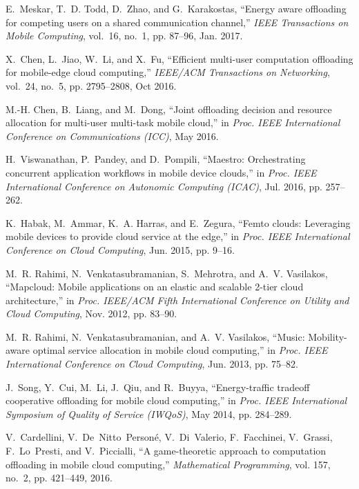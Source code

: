 \documentclass[10pt,journal,compsoc]{IEEEtran}
\begin{document}
{\begin{thebibliography}{10}
E.~Meskar, T.~D. Todd, D.~Zhao, and G.~Karakostas, ``Energy aware offloading
  for competing users on a shared communication channel,'' \emph{IEEE
  Transactions on Mobile Computing}, vol.~16, no.~1, pp. 87--96, Jan. 2017.

X.~Chen, L.~Jiao, W.~Li, and X.~Fu, ``Efficient multi-user computation
  offloading for mobile-edge cloud computing,'' \emph{IEEE/ACM Transactions on
  Networking}, vol.~24, no.~5, pp. 2795--2808, Oct 2016.

M.-H. Chen, B.~Liang, and M.~Dong, ``Joint offloading decision and resource
  allocation for multi-user multi-task mobile cloud,'' in \emph{Proc. IEEE
  International Conference on Communications (ICC)}, May 2016.

H.~Viswanathan, P.~Pandey, and D.~Pompili, ``Maestro: Orchestrating concurrent
  application workflows in mobile device clouds,'' in \emph{Proc. IEEE
  International Conference on Autonomic Computing (ICAC)}, Jul. 2016, pp.
  257--262.

K.~Habak, M.~Ammar, K.~A. Harras, and E.~Zegura, ``Femto clouds: Leveraging
  mobile devices to provide cloud service at the edge,'' in \emph{Proc. IEEE
  International Conference on Cloud Computing}, Jun. 2015, pp. 9--16.

M.~R. Rahimi, N.~Venkatasubramanian, S.~Mehrotra, and A.~V. Vasilakos,
  ``Mapcloud: Mobile applications on an elastic and scalable 2-tier cloud
  architecture,'' in \emph{Proc. IEEE/ACM Fifth International Conference on
  Utility and Cloud Computing}, Nov. 2012, pp. 83--90.

M.~R. Rahimi, N.~Venkatasubramanian, and A.~V. Vasilakos, ``Music:
  Mobility-aware optimal service allocation in mobile cloud computing,'' in
  \emph{Proc. IEEE International Conference on Cloud Computing}, Jun. 2013, pp.
  75--82.

J.~Song, Y.~Cui, M.~Li, J.~Qiu, and R.~Buyya, ``Energy-traffic tradeoff
  cooperative offloading for mobile cloud computing,'' in \emph{Proc. IEEE
  International Symposium of Quality of Service (IWQoS)}, May 2014, pp.
  284--289.

V.~Cardellini, V.~De~Nitto~Person{\'e}, V.~Di~Valerio, F.~Facchinei, V.~Grassi,
  F.~Lo~Presti, and V.~Piccialli, ``A game-theoretic approach to computation
  offloading in mobile cloud computing,'' \emph{Mathematical Programming}, vol.
  157, no.~2, pp. 421--449, 2016.


\end{thebibliography}}
\end{document}

